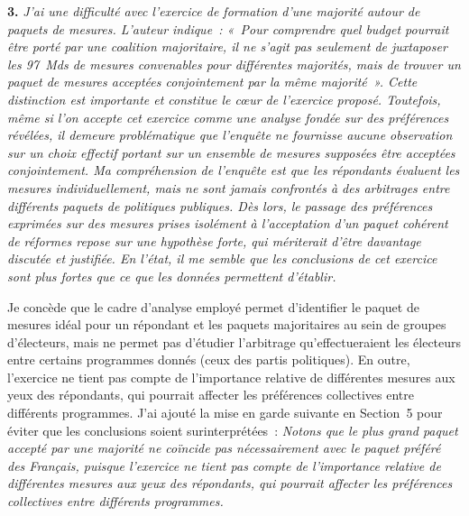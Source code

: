 \documentclass[12pt,french]{article}
\begin{document}
\bigskip
\noindent\textbf{3.} \textit{J'ai une difficulté avec l'exercice de formation d'une majorité autour de paquets de mesures. L'auteur indique~: «~Pour comprendre quel budget pourrait être porté par une coalition majoritaire, il ne s'agit pas seulement de juxtaposer les 97~Mds de mesures convenables pour différentes majorités, mais de trouver un paquet de mesures acceptées conjointement par la même majorité~». Cette distinction est importante et constitue le cœur de l'exercice proposé. Toutefois, même si l'on accepte cet exercice comme une analyse fondée sur des préférences révélées, il demeure problématique que l'enquête ne fournisse aucune observation sur un choix effectif portant sur un ensemble de mesures supposées être acceptées conjointement. Ma compréhension de l'enquête est que les répondants évaluent les mesures individuellement, mais ne sont jamais confrontés à des arbitrages entre différents paquets de politiques publiques. Dès lors, le passage des préférences exprimées sur des mesures prises isolément à l'acceptation d'un paquet cohérent de réformes repose sur une hypothèse forte, qui mériterait d'être davantage discutée et justifiée. En l'état, il me semble que les conclusions de cet exercice sont plus fortes que ce que les données permettent d'établir.}

Je concède que le cadre d'analyse employé permet d'identifier le paquet de mesures idéal pour un répondant et les paquets majoritaires au sein de groupes d'électeurs, mais ne permet pas d'étudier l'arbitrage qu'effectueraient les électeurs entre certains programmes donnés (ceux des partis politiques). En outre, l'exercice ne tient pas compte de l'importance relative de différentes mesures aux yeux des répondants, qui pourrait affecter les préférences collectives entre différents programmes. J'ai ajouté la mise en garde suivante en Section~5 pour éviter que les conclusions soient surinterprétées~: \textit{Notons que le plus grand paquet accepté par une majorité ne coïncide pas nécessairement avec le paquet préféré des Français, puisque l'exercice ne tient pas compte de l'importance relative de différentes mesures aux yeux des répondants, qui pourrait affecter les préférences collectives entre différents programmes. }
\end{document}
